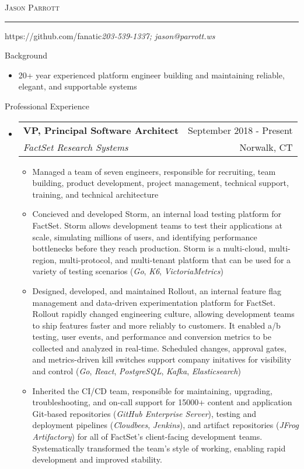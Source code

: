 \documentclass[letterpaper,10pt]{article}
\makeatletter
\newcommand{\name}{Jason Parrott}
\newcommand{\addr}{https://github.com/fanatic}
\newcommand{\phone}{203-539-1337}
\newcommand{\email}{jason@parrott.ws}
\newcommand{\bigname}[1]{
	\begin{center}\fontfamily{phv}\selectfont\Huge\scshape#1\end{center}
}
\newenvironment{ressection}[1]{
	\vspace{4pt}
	{\fontfamily{phv}\selectfont\Large#1}
	\begin{itemize}
	\vspace{3pt}
}{
	\end{itemize}
}
\newcommand{\ressubitem}[1]{
	\vspace{-1pt}
	\item \begin{flushleft} #1 \end{flushleft}
}
\newcommand{\resbigitem}[4]{
	\vspace{-5pt}
	\item
	\begin{tabular*}{6in}{l@{\extracolsep{\fill}}r}
		\textbf{#1} & #2 \\
		\textit{#3} & #4\\
	\end{tabular*}
}
\newenvironment{ressubsec}[4]{
	\resbigitem{#1}{#2}{#3}{#4}
	\vspace{-2pt}
	\begin{itemize}
}{
	\end{itemize}
}
\makeatother
\begin{document}
\bigname{\name}

\vspace{-8pt} \rule{\textwidth}{1pt}

\vspace{-1pt} {\small \addr \hfill \itshape\phone; \email}

\vspace{8 pt}

\begin{ressection}{Background}
	\item[]
	20+ year experienced platform engineer building and maintaining reliable, elegant, and supportable systems
\end{ressection}

\begin{ressection}{Professional Experience}
	\begin{ressubsec}{VP, Principal Software Architect}{September 2018 - Present}{FactSet Research Systems}{Norwalk, CT}
		\ressubitem{Managed a team of seven engineers, responsible for recruiting, team building, product development, project management, technical support, training, and technical architecture}
		\ressubitem{Concieved and developed Storm, an internal load testing platform for FactSet.  Storm allows development teams to test their applications at scale, simulating millions of users, and identifying performance bottlenecks before they reach production.  Storm is a multi-cloud, multi-region, multi-protocol, and multi-tenant platform that can be used for a variety of testing scenarios (\textit{Go}, \textit{K6}, \textit{VictoriaMetrics})}
		\ressubitem{Designed, developed, and maintained Rollout, an internal feature flag management and data-driven experimentation platform for FactSet.  Rollout rapidly changed engineering culture, allowing development teams to ship features faster and more reliably to customers.  It enabled a/b testing, user events, and performance and conversion metrics to be collected and analyzed in real-time.  Scheduled changes, approval gates, and metrics-driven kill switches support company initatives for visibility and control (\textit{Go}, \textit{React}, \textit{PostgreSQL}, \textit{Kafka}, \textit{Elasticsearch})}
		\ressubitem{Inherited the CI/CD team, responsible for maintaining, upgrading, troubleshooting, and on-call support for 15000+ content and application Git-based repositories (\textit{GitHub Enterprise Server}), testing and deployment pipelines (\textit{Cloudbees}, \textit{Jenkins}), and artifact repositories (\textit{JFrog Artifactory}) for all of FactSet's client-facing development teams.  Systematically transformed the team's style of working, enabling rapid development and improved stability.}

\end{ressubsec}
\end{ressection}
\end{document}
